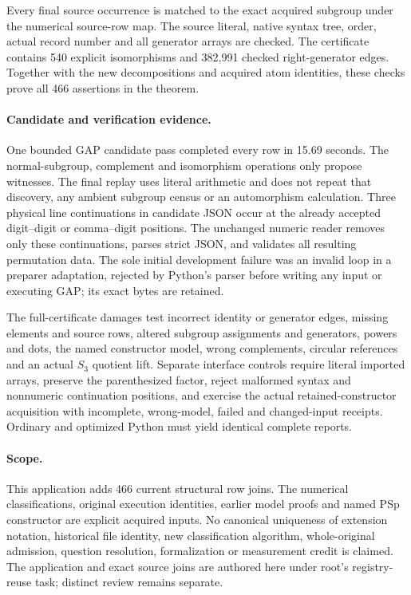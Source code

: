 \documentclass[11pt]{article}
\begin{document}
Every final source occurrence is matched to the exact acquired subgroup
under the numerical source-row map. The source literal, native syntax tree,
order, actual record number and all generator arrays are checked. The
certificate contains 540 explicit isomorphisms and 382,991 checked
right-generator edges. Together with the new decompositions and acquired
atom identities, these checks prove all 466 assertions in the theorem.

\paragraph{Candidate and verification evidence.}
One bounded GAP candidate pass completed every row in 15.69 seconds.
The normal-subgroup, complement and isomorphism operations only propose
witnesses. The final replay uses literal arithmetic and does not repeat
that discovery, any ambient subgroup census or an automorphism calculation.
Three physical line continuations in candidate JSON occur at the already
accepted digit--digit or comma--digit positions. The unchanged numeric
reader removes only these continuations, parses strict JSON, and validates
all resulting permutation data. The sole initial development failure was
an invalid loop in a preparer adaptation, rejected by Python's parser
before writing any input or executing GAP; its exact bytes are retained.

The full-certificate damages test incorrect identity or generator edges,
missing elements and source rows, altered subgroup assignments and
generators, powers and dots, the named constructor model, wrong complements,
circular references and an actual $S_3$ quotient lift. Separate interface
controls require literal imported arrays, preserve the parenthesized
factor, reject malformed syntax and nonnumeric continuation positions,
and exercise the actual retained-constructor acquisition with incomplete,
wrong-model, failed and changed-input receipts. Ordinary and optimized
Python must yield identical complete reports.

\paragraph{Scope.}
This application adds 466 current structural row joins. The numerical
classifications, original execution identities, earlier model proofs and
named PSp constructor are explicit acquired inputs. No canonical uniqueness
of extension notation, historical file identity, new classification
algorithm, whole-original admission, question resolution, formalization
or measurement credit is claimed. The application and exact source joins
are authored here under root's registry-reuse task; distinct review remains
separate.
\end{document}
